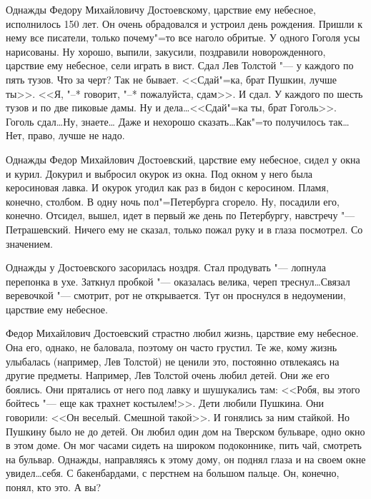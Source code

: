 Однажды Федору Михайловичу Достоевскому, царствие ему небесное, исполнилось 150
лет. Он очень обрадовался и устроил день рождения. Пришли к нему все писатели, 
только почему"=то все наголо обритые. У одного Гоголя усы нарисованы. Ну хорошо,
выпили, закусили, поздравили новорожденного, царствие ему небесное, сели играть 
в вист. Сдал Лев Толстой "--- у каждого по пять тузов. Что за черт? Так не 
бывает. <<Сдай"=ка, брат Пушкин, лучше ты>>. <<Я,  "--* говорит, "--* 
пожалуйста, сдам>>. И сдал. У каждого по шесть тузов и по две пиковые дамы. Ну 
и дела\dots <<Сдай"=ка ты, брат Гоголь>>. Гоголь сдал\dots Ну, знаете\dots 
Даже и нехорошо сказать\dots Как"=то получилось так\dots Нет, право, лучше не 
надо.

Однажды Федор Михайлович Достоевский, царствие ему небесное, сидел у окна и 
курил. Докурил и выбросил окурок из окна. Под окном у него была керосиновая 
лавка. И окурок угодил как раз в бидон с керосином. Пламя, конечно, столбом. В  
одну ночь пол"=Петербурга сгорело. Ну, посадили его, конечно. Отсидел, вышел, 
идет в первый же день по Петербургу, навстречу "--- Петрашевский. Ничего ему не 
сказал, только пожал руку и в глаза посмотрел. Со значением.

Однажды у Достоевского засорилась ноздря. Стал продувать "--- лопнула перепонка 
в ухе. Заткнул пробкой "--- оказалась велика, череп треснул\dots Связал 
веревочкой "--- смотрит, рот не открывается. Тут он проснулся в недоумении, 
царствие ему небесное.

Федор Михайлович Достоевский страстно любил жизнь, царствие ему небесное. Она 
его, однако, не баловала, поэтому он часто грустил. Те же, кому жизнь улыбалась 
(например, Лев Толстой) не ценили это, постоянно отвлекаясь на другие предметы. 
Например, Лев Толстой очень любил детей. Они же его боялись. Они прятались от 
него под лавку и шушукались там: <<Робя, вы этого бойтесь "--- еще как трахнет 
костылем!>>. Дети любили Пушкина. Они говорили: <<Он веселый. Смешной такой>>. И 
гонялись за ним стайкой. Но Пушкину было не до детей. Он любил один дом на 
Тверском бульваре, одно окно в этом доме. Он мог часами сидеть на широком 
подоконнике, пить чай, смотреть на бульвар. Однажды, направляясь к этому дому, 
он поднял глаза и на своем окне увидел\dots себя. С бакенбардами, с перстнем на 
большом пальце. Он, конечно, понял, кто это. А вы?